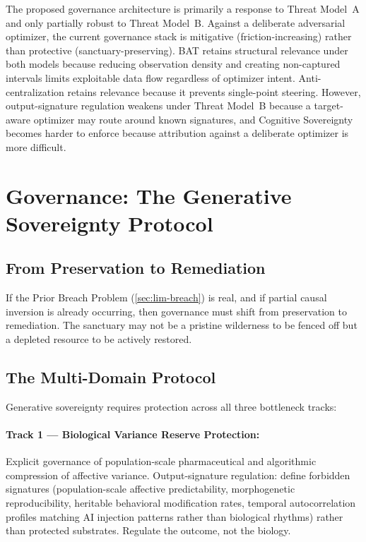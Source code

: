 \documentclass[11pt, a4paper]{article}
\theoremstyle{remark}
\begin{document}
The proposed governance architecture is primarily a response to Threat Model~A and only partially robust to Threat Model~B. Against a deliberate adversarial optimizer, the current governance stack is mitigative (friction-increasing) rather than protective (sanctuary-preserving). BAT retains structural relevance under both models because reducing observation density and creating non-captured intervals limits exploitable data flow regardless of optimizer intent. Anti-centralization retains relevance because it prevents single-point steering. However, output-signature regulation weakens under Threat Model~B because a target-aware optimizer may route around known signatures, and Cognitive Sovereignty becomes harder to enforce because attribution against a deliberate optimizer is more difficult.

\section{Governance: The Generative Sovereignty Protocol}\label{sec:governance}

\subsection{From Preservation to Remediation}\label{sec:remediation}

If the Prior Breach Problem (\cref{sec:lim-breach}) is real, and if partial causal inversion is already occurring, then governance must shift from preservation to remediation. The sanctuary may not be a pristine wilderness to be fenced off but a depleted resource to be actively restored.

\subsection{The Multi-Domain Protocol}\label{sec:protocol}

Generative sovereignty requires protection across all three bottleneck tracks:

\paragraph{Track 1 --- Biological Variance Reserve Protection:} Explicit governance of population-scale pharmaceutical and algorithmic compression of affective variance. Output-signature regulation: define forbidden signatures (population-scale affective predictability, morphogenetic reproducibility, heritable behavioral modification rates, temporal autocorrelation profiles matching AI injection patterns rather than biological rhythms) rather than protected substrates. Regulate the outcome, not the biology.
\end{document}

